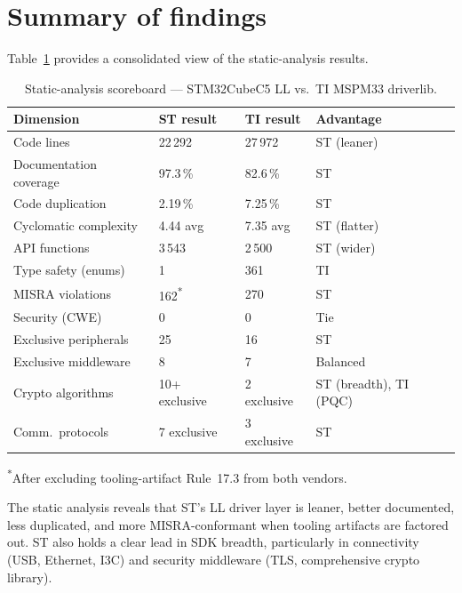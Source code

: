 \section{Summary of findings}
\label{sec:ti-static-summary}

Table~\ref{tab:ti-summary-scoreboard} provides a consolidated view of the static-analysis
results.

\begin{table}[H]
\centering
\caption{Static-analysis scoreboard --- STM32CubeC5 LL vs.\ TI MSPM33 driverlib.}
\label{tab:ti-summary-scoreboard}
\begin{tabular}{l l l l}
\toprule
\textbf{Dimension} & \textbf{ST result} & \textbf{TI result} & \textbf{Advantage} \\
\midrule
Code lines            & 22\,292          & 27\,972          & ST (leaner) \\
Documentation coverage & 97.3\,\%        & 82.6\,\%         & ST \\
Code duplication       & 2.19\,\%        & 7.25\,\%         & ST \\
Cyclomatic complexity  & 4.44 avg        & 7.35 avg         & ST (flatter) \\
API functions          & 3\,543          & 2\,500           & ST (wider) \\
Type safety (enums)    & 1               & 361              & TI \\
MISRA violations       & 162\textsuperscript{*} & 270       & ST \\
Security (CWE)         & 0               & 0                & Tie \\
Exclusive peripherals  & 25              & 16               & ST \\
Exclusive middleware   & 8               & 7                & Balanced \\
Crypto algorithms      & 10+ exclusive   & 2 exclusive      & ST (breadth), TI (PQC) \\
Comm.\ protocols       & 7 exclusive     & 3 exclusive      & ST \\
\bottomrule
\end{tabular}
\par\smallskip
{\footnotesize \textsuperscript{*}After excluding tooling-artifact Rule~17.3 from both vendors.}
\end{table}

The static analysis reveals that ST's LL driver layer is leaner, better documented, less
duplicated, and more MISRA-conformant when tooling artifacts are factored out. ST also holds
a clear lead in SDK breadth, particularly in connectivity (USB, Ethernet, I3C) and security
middleware (TLS, comprehensive crypto library).

